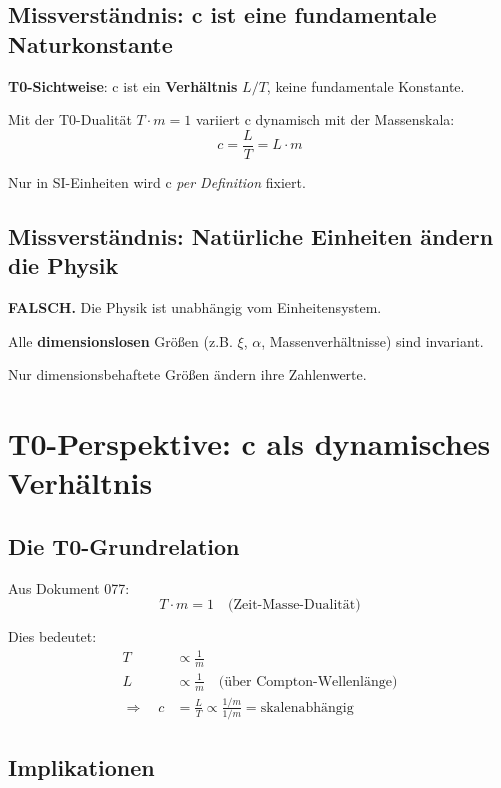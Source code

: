 	\subsection{Missverständnis: c ist eine fundamentale Naturkonstante}
	
	\textbf{T0-Sichtweise}: c ist ein \textbf{Verhältnis} $L/T$, keine fundamentale Konstante.
	
	Mit der T0-Dualität $T \cdot m = 1$ variiert c dynamisch mit der Massenskala:
	\begin{equation}
		c = \frac{L}{T} = L \cdot m
	\end{equation}
	
	Nur in SI-Einheiten wird c \emph{per Definition} fixiert.
	
	\subsection{Missverständnis: Natürliche Einheiten ändern die Physik}
	
	\textbf{FALSCH.} Die Physik ist unabhängig vom Einheitensystem.
	
	Alle \textbf{dimensionslosen} Größen (z.B. $\xi$, $\alpha$, Massenverhältnisse) sind invariant.
	
	Nur dimensionsbehaftete Größen ändern ihre Zahlenwerte.
	
	\section{T0-Perspektive: c als dynamisches Verhältnis}
	
	\subsection{Die T0-Grundrelation}
	
	Aus Dokument 077:
	\begin{equation}
		T \cdot m = 1 \quad \text{(Zeit-Masse-Dualität)}
	\end{equation}
	
	Dies bedeutet:
	\begin{align}
		T &\propto \frac{1}{m} \\
		L &\propto \frac{1}{m} \quad \text{(über Compton-Wellenlänge)} \\
		\Rightarrow \quad c &= \frac{L}{T} \propto \frac{1/m}{1/m} = \text{skalenabhängig}
	\end{align}
	
	\subsection{Implikationen}
	
